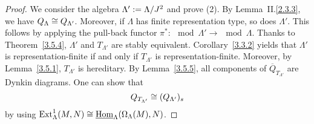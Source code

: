 
\begin{proof}
We consider the algebra $\Lambda' := \Lambda/J^2$ and prove (2). By Lemma~II.\ref{2.3.3}, we have $Q_\Lambda \cong Q_{\Lambda'}$. Moreover, if $\Lambda$ has finite representation type, so does $\Lambda'$. This follows by applying the pull-back functor $\pi^* : \mod{\Lambda'}
\to \mod \Lambda$. Thanks to Theorem~\ref{3.5.4}, $\Lambda'$ and $T_{\Lambda'}$ are stably equivalent. Corollary~\ref{3.3.2} yields that
$\Lambda'$ is representation-finite if and only if $T_{\Lambda'}$ is representation-finite. Moreover, by Lemma~\ref{3.5.1}, $T_{\Lambda'}$ is hereditary. By Lemma~\ref{3.5.5}, all components of $\overline Q_{T_{\Lambda'}}$ are Dynkin diagrams. One can show
that
\[
Q_{T_{\Lambda'}} \cong (Q_{\Lambda'})_s
\]
by using $\operatorname{Ext}_\Lambda^1(M,N)\cong \operatorname{\underline{\operatorname{Hom}}}_\Lambda (\Omega_\Lambda(M),N)$.
\end{proof}


